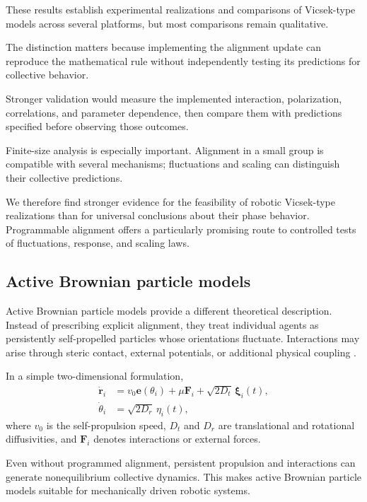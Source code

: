These results establish experimental
realizations and comparisons of
Vicsek-type models across several
platforms, but most comparisons
remain qualitative.

The distinction matters because
implementing the alignment update
can reproduce the mathematical
rule without independently testing
its predictions for collective
behavior.

Stronger validation would measure
the implemented interaction,
polarization, correlations, and
parameter dependence, then compare
them with predictions specified
before observing those outcomes.

Finite-size analysis is especially
important. Alignment in a small
group is compatible with several
mechanisms; fluctuations and
scaling can distinguish
their collective predictions.

We therefore find stronger evidence
for the feasibility of robotic
Vicsek-type realizations than for
universal conclusions about their
phase behavior. Programmable
alignment offers a particularly
promising route to controlled tests
of fluctuations, response, and
scaling laws.

\subsection{Active Brownian particle models}
\label{sec:theory-abp}

Active Brownian particle models provide
a different theoretical description.
Instead of prescribing explicit
alignment, they treat individual
agents as persistently self-propelled
particles whose orientations fluctuate.
Interactions may arise through
steric contact, external potentials,
or additional physical coupling
\cite{Bechinger2016active}.

In a simple two-dimensional formulation,
\begin{align}
\dot{\mathbf r}_i &=
v_0\mathbf e(\theta_i)
+\mu\mathbf F_i
+\sqrt{2D_t}\,\boldsymbol{\xi}_i(t),
\\
\dot{\theta}_i &=
\sqrt{2D_r}\,\eta_i(t),
\label{eq:theory-abp}
\end{align}
where $v_0$ is the self-propulsion speed,
$D_t$ and $D_r$ are translational and
rotational diffusivities, and
$\mathbf F_i$ denotes interactions
or external forces.

Even without programmed alignment,
persistent propulsion and interactions
can generate nonequilibrium collective
dynamics. This makes active Brownian
particle models suitable for
mechanically driven robotic systems.

